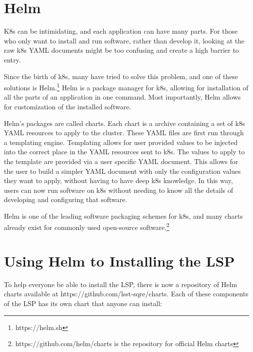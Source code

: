 \documentclass[11pt,twoside]{article}
\begin{document}
\section{Helm}

K8s can be intimidating, and each application can have many parts.  For those who only
want to install and run software, rather than develop it, looking at the raw
k8s YAML documents might be too confusing and create a high barrier to entry.

Since the birth of k8s, many have tried to solve this problem, and one of these
solutions is Helm.\footnote{https://helm.sh}  Helm is a package manager for k8s, allowing
for installation of all the parts of an application in one command.
Most importantly, Helm allows for customization of the installed software.

Helm's packages are called charts.  Each chart is a  archive containing a set of
k8s YAML resources to apply to the cluster.  These YAML files are first run through
a templating engine.  Templating allows for user provided values to be injected
into the correct place in the YAML resources sent to k8s.
The values to apply to the template are provided via a user specific YAML document.
This allows for the user to build a simpler YAML document with only the configuration
values they want to apply, without having to have deep k8s knowledge.  In this way,
users can now run software on k8s without needing to know all the details of developing
and configuring that software.

Helm is one of the leading software packaging schemes for k8s, and many charts
already exist for commonly used open-source software.\footnote{https://github.com/helm/charts
is the repository for official Helm charts}

\section{Using Helm to Installing the LSP}

To help everyone be able to install the LSP, there is now a repository of Helm
charts available at https://github.com/lsst-sqre/charts.  Each of these components
of the LSP has its own chart that anyone can install:
\end{document}
